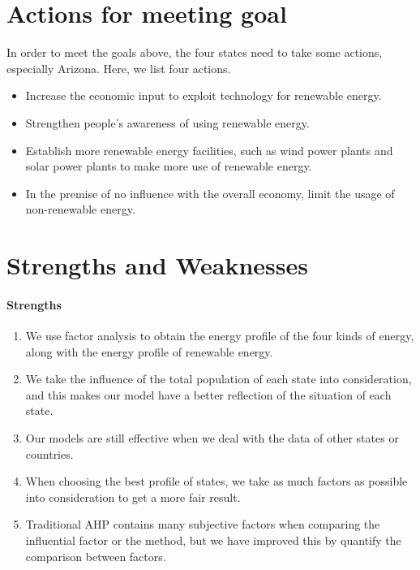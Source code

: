 \documentclass[a4paper,11pt]{article}
\begin{document}
\section{Actions for meeting goal}
\par In order to meet the goals above, the four states need to take some actions, especially Arizona. Here, we list four actions.
\begin{itemize}
    \item Increase the economic input to exploit technology for renewable energy. 
    \item Strengthen people's awareness of using renewable energy.
    \item Establish more renewable energy facilities, such as wind power plants and solar power plants to make more use of renewable energy.
    \item In the premise of no influence with the overall economy, limit the usage of non-renewable energy.
\end{itemize}


\section{Strengths and Weaknesses}

\paragraph{Strengths}
\text{\\}
\begin{enumerate}%
\renewcommand{\labelenumi}{(\theenumi)}
    \item We use factor analysis to obtain the energy profile of the four kinds of energy, along with the energy profile of renewable energy.
    \item We take the influence of the total population of each state into consideration, and this makes our model have a better reflection of the situation of each state.
    \item Our models are still effective when we deal with the data of other states or countries.
    \item When choosing the best profile of states, we take as much factors as possible into consideration to get a more fair result.
    \item Traditional AHP contains many subjective factors when comparing the influential factor or the method, but we have improved this by quantify the comparison between factors.
\end{enumerate}
\end{document}
